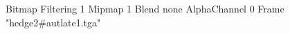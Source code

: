 {Bitmap
	{Filtering 1}
	{Mipmap 1}
	{Blend none}
	{AlphaChannel 0}
	{Frame "hedge2#autlate1.tga"}
}
